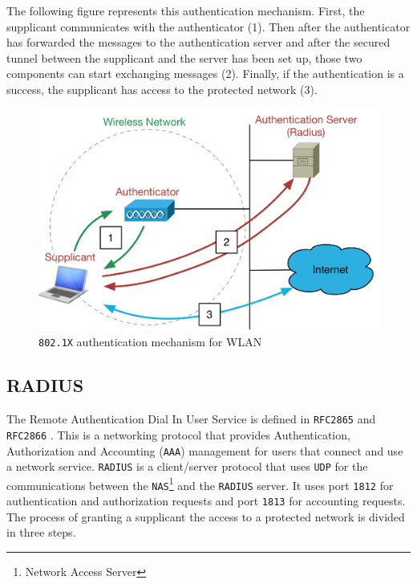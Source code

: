 The following figure represents this authentication mechanism. First, the supplicant communicates with the authenticator (1). Then after the authenticator has forwarded the messages to the authentication server and after the secured tunnel between the supplicant and the server has been set up, those two components can start exchanging messages (2). Finally, if the authentication is a success, the supplicant has access to the protected network (3).

\begin{figure}[H]
	\begin{center}
	\includegraphics[width=.7\linewidth]{Pictures/chapter2/802.png}
	\caption{\texttt{802.1X} authentication mechanism for WLAN}
	\end{center}
\end{figure}


\subsection{RADIUS}
The Remote Authentication Dial In User Service is defined in \texttt{RFC2865} \cite{rfc2865} and \texttt{RFC2866} \cite{rfc2866}. This is a networking protocol that provides Authentication, Authorization and Accounting (\texttt{AAA}) management for users that connect and use a network service. \texttt{RADIUS} is a client/server protocol that uses \texttt{UDP} for the communications between the \texttt{NAS}\footnote{Network Access Server} and the \texttt{RADIUS} server. It uses port \texttt{1812} for authentication and authorization requests and port \texttt{1813} for accounting requests. The process of granting a supplicant the access to a protected network is divided in three steps.

